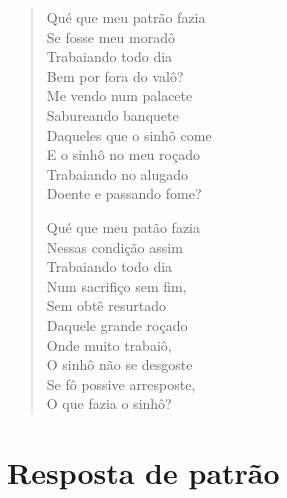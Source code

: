 \begin{verse}
Qué que meu patrão fazia\\
Se fosse meu moradô\\
Trabaiando todo dia\\
Bem por fora do valô?\\
Me vendo num palacete\\
Sabureando banquete\\
Daqueles que o sinhô come\\
E o sinhô no meu roçado\\
Trabaiando no alugado\\
Doente e passando fome?

Qué que meu patão fazia\\
Nessas condição assim\\
Trabaiando todo dia\\
Num sacrifiço sem fim,\\
Sem obtê resurtado\\
Daquele grande roçado\\
Onde muito trabaiô,\\
O sinhô não se desgoste\\
Se fô possive arresposte,\\
O que fazia o sinhô?
\end{verse}

\chapter{Resposta de patrão}

